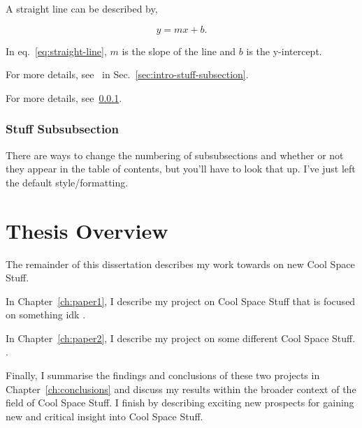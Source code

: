 \lipsum[2]

A straight line can be described by,

\begin{equation} \label{eq:straight-line}
    y = mx + b. %
\end{equation} 


In eq.~\ref{eq:straight-line}, $m$ is the slope of the line and $b$ is the y-intercept.

For more details, see~\textbf{} in Sec.~\ref{sec:intro-stuff-subsection}.

For more details, see~\ref{sec:intro-stuff-subsubsection}.


\subsubsection{Stuff Subsubsection}
\label{sec:intro-stuff-subsubsection}

There are ways to change the numbering of subsubsections and whether or not they appear in the table of contents, but you'll have to look that up.
I've just left the default style/formatting.


\section{Thesis Overview}
\label{sec:intro-overview}


The remainder of this dissertation describes my work towards on new Cool Space Stuff.

In Chapter~\ref{ch:paper1}, I describe my project on Cool Space Stuff that is focused on something idk \citep[published as][]{2017Icar..293...52O}.

In Chapter~\ref{ch:paper2}, I describe my project on some different Cool Space Stuff.  \citep[publication accepted; preprint posted as][]{2023arXiv230612967O}.

Finally, I summarise the findings and conclusions of these two projects in Chapter~\ref{ch:conclusions} and discuss my results within the broader context of the field of Cool Space Stuff. I finish by describing exciting new prospects for gaining new and critical insight into Cool Space Stuff.